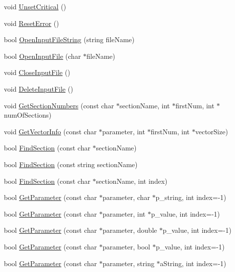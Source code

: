 \begin{DoxyCompactItemize}
void \hyperlink{classbase_a5c9e361dfd9a7804a33b7baa8f5a4b1f}{UnsetCritical} ()
\item 
void \hyperlink{classbase_af192519b5f92a24a2fdb5d0696fe01b4}{ResetError} ()
\item 
bool \hyperlink{classbase_a82e26b779409159be745275990ef9c99}{OpenInputFileString} (string fileName)
\item 
bool \hyperlink{classbase_a551ea12cd21bfc786892b5bb8c333ee0}{OpenInputFile} (char $\ast$fileName)
\item 
void \hyperlink{classbase_a56480e2d42e0f66e1416dbf064a913d1}{CloseInputFile} ()
\item 
void \hyperlink{classbase_a7ca584f6b100bb78cbaec8cfaaf9a30c}{DeleteInputFile} ()
\item 
void \hyperlink{classbase_a4f63fec241f5857f3fe28b43f85d0fa5}{GetSectionNumbers} (const char $\ast$sectionName, int $\ast$firstNum, int $\ast$numOfSections)
\item 
void \hyperlink{classbase_ad413a7174fe9559a9b6f23f39d286c5c}{GetVectorInfo} (const char $\ast$parameter, int $\ast$firstNum, int $\ast$vectorSize)
\item 
bool \hyperlink{classbase_a88e41ff60ffb7e707312a09f20457e73}{FindSection} (const char $\ast$sectionName)
\item 
bool \hyperlink{classbase_af8ea646e73b042204ee13bb9e1528a44}{FindSection} (const string sectionName)
\item 
bool \hyperlink{classbase_afec295182d9081861379a5cd10b62ca7}{FindSection} (const char $\ast$sectionName, int index)
\item 
bool \hyperlink{classbase_aff0b96b92d78c345fd60335cece99d08}{GetParameter} (const char $\ast$parameter, char $\ast$p\_\-string, int index=-\/1)
\item 
bool \hyperlink{classbase_a2643c255e2ae69b02c1ef7a427743453}{GetParameter} (const char $\ast$parameter, int $\ast$p\_\-value, int index=-\/1)
\item 
bool \hyperlink{classbase_ac3ea2aa929c9e33a064b9de01bf65788}{GetParameter} (const char $\ast$parameter, double $\ast$p\_\-value, int index=-\/1)
\item 
bool \hyperlink{classbase_a9cadba73da20536578f34f7e020d4c3e}{GetParameter} (const char $\ast$parameter, bool $\ast$p\_\-value, int index=-\/1)
\item 
bool \hyperlink{classbase_a02555c2565ace1d8e91dd539e38a74ca}{GetParameter} (const char $\ast$parameter, string $\ast$aString, int index=-\/1)
\item 

\end{DoxyCompactItemize}
